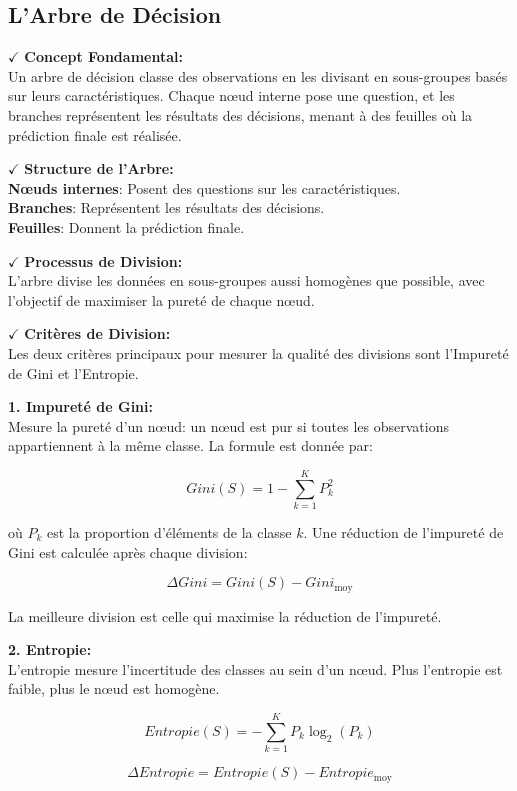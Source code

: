 \subsection{L’Arbre de Décision}

\textbf{\(\checkmark\)} \textbf{Concept Fondamental:}\\
Un arbre de décision classe des observations en les divisant en sous-groupes basés sur leurs caractéristiques. Chaque nœud interne pose une question, et les branches représentent les résultats des décisions, menant à des feuilles où la prédiction finale est réalisée.

\textbf{\(\checkmark\)} \textbf{Structure de l'Arbre:}\\
\textbf{Nœuds internes}: Posent des questions sur les caractéristiques.\\
\textbf{Branches}: Représentent les résultats des décisions.\\
\textbf{Feuilles}: Donnent la prédiction finale.

\textbf{\(\checkmark\)} \textbf{Processus de Division:}\\
L'arbre divise les données en sous-groupes aussi homogènes que possible, avec l'objectif de maximiser la pureté de chaque nœud.

\textbf{\(\checkmark\)} \textbf{Critères de Division:}\\
Les deux critères principaux pour mesurer la qualité des divisions sont l'Impureté de Gini et l'Entropie.

\textbf{1. Impureté de Gini:}\\
Mesure la pureté d’un nœud: un nœud est pur si toutes les observations appartiennent à la même classe. La formule est donnée par:

\[
Gini(S) = 1 - \sum_{k=1}^{K} P_k^2
\]

où \( P_k \) est la proportion d'éléments de la classe \( k \). Une réduction de l'impureté de Gini est calculée après chaque division:

\[
\Delta Gini = Gini(S) - Gini_{\text{moy}}
\]

La meilleure division est celle qui maximise la réduction de l'impureté.

\textbf{2. Entropie:}\\
L'entropie mesure l'incertitude des classes au sein d’un nœud. Plus l'entropie est faible, plus le nœud est homogène.

\[
Entropie(S) = -\sum_{k=1}^{K} P_k \log_2(P_k)
\]

\[
\Delta Entropie = Entropie(S) - Entropie_{\text{moy}}
\]

